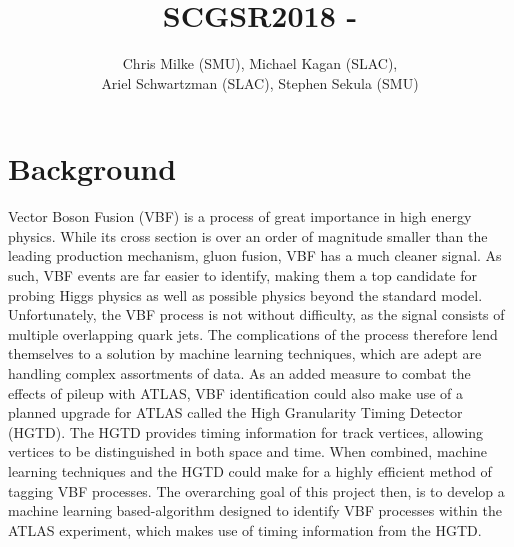 \documentclass[12pt,letterpaper]{article}
\begin{document}
\pagestyle{fancy}


\pagestyle{plain}
\label{sec:coverpaqe}




\title{{\large SCGSR2018 - }}

\author{Chris Milke (SMU), Michael Kagan (SLAC),\\
  Ariel Schwartzman (SLAC), Stephen Sekula (SMU)}


\date{}

\maketitle

\newpage


\section*{Background}
    Vector Boson Fusion (VBF) is a process of great importance in high energy physics. While its cross section is over an order of magnitude smaller than the leading production mechanism, gluon fusion\cite{deFlorian:2016spz}, VBF has a much cleaner signal. As such, VBF events are far easier to identify, making them a top candidate for probing Higgs physics as well as possible physics beyond the standard model. Unfortunately, the VBF process is not without difficulty, as the signal consists of multiple overlapping quark jets. The complications of the process therefore lend themselves to a solution by machine learning techniques, which are adept are handling complex assortments of data. As an added measure to combat the effects of pileup with ATLAS, VBF identification could also make use of a planned upgrade for ATLAS called the High Granularity Timing Detector (HGTD). The HGTD provides timing information for track vertices, allowing vertices to be distinguished in both space and time. When combined, machine learning techniques and the HGTD could make for a highly efficient method of tagging VBF processes. The overarching goal of this project then, is to develop a machine learning based-algorithm designed to identify VBF processes within the ATLAS experiment, which makes use of timing information from the HGTD.
\end{document}

